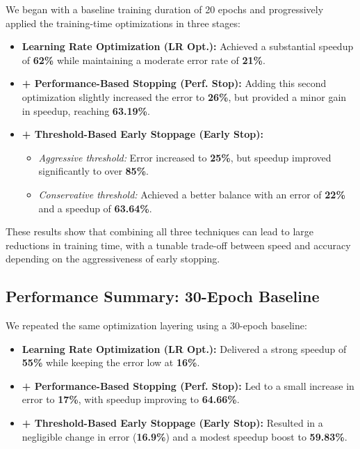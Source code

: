 We began with a baseline training duration of 20 epochs and progressively applied the training-time optimizations in three stages:

\begin{itemize}
    \item \textbf{Learning Rate Optimization (LR Opt.):}  
    Achieved a substantial speedup of \textbf{62\%} while maintaining a moderate error rate of \textbf{21\%}.
    
    \item \textbf{+ Performance-Based Stopping (Perf. Stop):}  
    Adding this second optimization slightly increased the error to \textbf{26\%}, but provided a minor gain in speedup, reaching \textbf{63.19\%}.
    
    \item \textbf{+ Threshold-Based Early Stoppage (Early Stop):}  
    \begin{itemize}
        \item \emph{Aggressive threshold:} Error increased to \textbf{25\%}, but speedup improved significantly to over \textbf{85\%}.
        \item \emph{Conservative threshold:} Achieved a better balance with an error of \textbf{22\%} and a speedup of \textbf{63.64\%}.
    \end{itemize}
\end{itemize}

These results show that combining all three techniques can lead to large reductions in training time, with a tunable trade-off between speed and accuracy depending on the aggressiveness of early stopping.

\vspace{1em}
\subsection*{Performance Summary: 30-Epoch Baseline}

We repeated the same optimization layering using a 30-epoch baseline:

\begin{itemize}
    \item \textbf{Learning Rate Optimization (LR Opt.):}  
    Delivered a strong speedup of \textbf{55\%} while keeping the error low at \textbf{16\%}.
    
    \item \textbf{+ Performance-Based Stopping (Perf. Stop):}  
    Led to a small increase in error to \textbf{17\%}, with speedup improving to \textbf{64.66\%}.
    
    \item \textbf{+ Threshold-Based Early Stoppage (Early Stop):}  
    Resulted in a negligible change in error (\textbf{16.9\%}) and a modest speedup boost to \textbf{59.83\%}.
\end{itemize}

